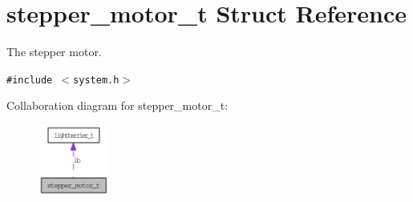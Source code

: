\hypertarget{structstepper__motor__t}{
\section{stepper\_\-motor\_\-t Struct Reference}
\label{structstepper__motor__t}
}
The stepper motor.  


{\tt \#include $<$system.h$>$}

Collaboration diagram for stepper\_\-motor\_\-t:\nopagebreak
\begin{figure}[H]
\begin{center}
\leavevmode
\includegraphics[width=65pt]{structstepper__motor__t__coll__graph}
\end{center}
\end{figure}
